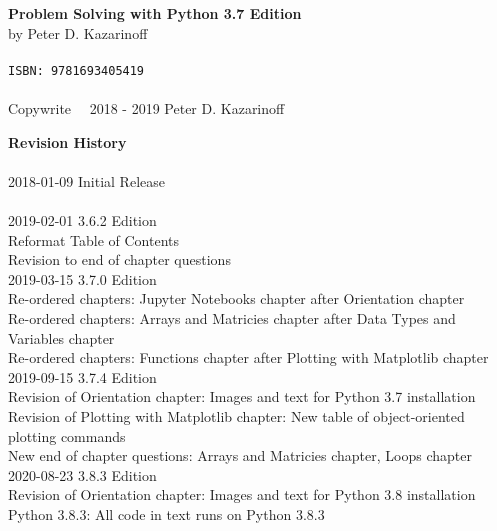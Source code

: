
\textbf{Problem Solving with Python 3.7 Edition} \\
by Peter D. Kazarinoff \\
\\
\texttt{ISBN: 9781693405419} \\
\\
Copywrite \  \textcopyright \  2018 - 2019 Peter D. Kazarinoff\\

\vspace{3in}

\textbf{Revision History}\\
\\
2018-01-09 Initial Release\\
\\
2019-02-01 3.6.2 Edition\\
Reformat Table of Contents\\
Revision to end of chapter questions\\

2019-03-15 3.7.0 Edition \\
Re-ordered chapters: Jupyter Notebooks chapter after Orientation chapter \\
Re-ordered chapters: Arrays and Matricies chapter after Data Types and Variables chapter \\
Re-ordered chapters: Functions chapter after Plotting with Matplotlib chapter \\

2019-09-15 3.7.4 Edition \\
Revision of Orientation chapter: Images and text for Python 3.7 installation \\
Revision of Plotting with Matplotlib chapter: New table of object-oriented plotting commands \\
New end of chapter questions: Arrays and Matricies chapter, Loops chapter \\

2020-08-23 3.8.3 Edition \\
Revision of Orientation chapter: Images and text for Python 3.8 installation \\
Python 3.8.3: All code in text runs on Python 3.8.3 \\

